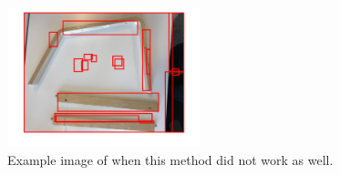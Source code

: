 \begin{figure}[hbtp]
\begin{center}
\includegraphics[width = 0.5\textwidth]{./Images/badMatlab.png}
\caption{Example image of when this method did not work as well.}
\label{fig:badMatlabImage}
\end{center}
\end{figure}

\newpage